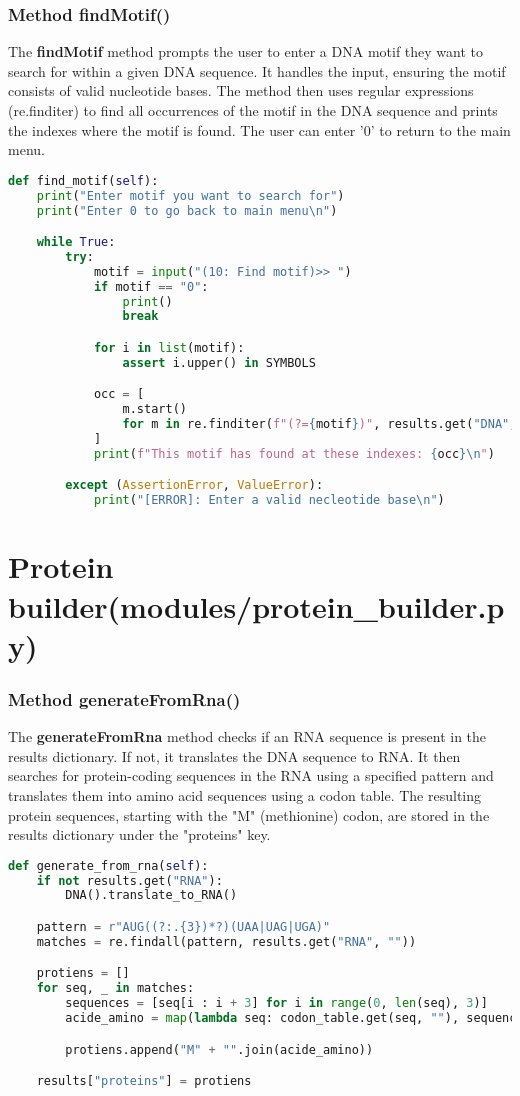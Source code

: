 \documentclass[11pt]{article}
\begin{document}
\subsubsection{Method findMotif()}
The \textbf{findMotif} method prompts the user to enter a DNA motif they want to search for within a given DNA sequence. It handles the input, ensuring the motif consists of valid nucleotide bases. The method then uses regular expressions (re.finditer) to find all occurrences of the motif in the DNA sequence and prints the indexes where the motif is found. The user can enter '0' to return to the main menu.
\begin{lstlisting}[language=Python, style=PythonStyle]
def find_motif(self):
    print("Enter motif you want to search for")
    print("Enter 0 to go back to main menu\n")

    while True:
        try:
            motif = input("(10: Find motif)>> ")
            if motif == "0":
                print()
                break

            for i in list(motif):
                assert i.upper() in SYMBOLS

            occ = [
                m.start()
                for m in re.finditer(f"(?={motif})", results.get("DNA", ""))
            ]
            print(f"This motif has found at these indexes: {occ}\n")

        except (AssertionError, ValueError):
            print("[ERROR]: Enter a valid necleotide base\n")
\end{lstlisting}

\section{Protein builder(modules/protein\_builder.py)}
\subsubsection{Method generateFromRna()}
The \textbf{generateFromRna} method checks if an RNA sequence is present in the results dictionary. If not, it translates the DNA sequence to RNA. It then searches for protein-coding sequences in the RNA using a specified pattern and translates them into amino acid sequences using a codon table. The resulting protein sequences, starting with the "M" (methionine) codon, are stored in the results dictionary under the "proteins" key.
\begin{lstlisting}[language=Python, style=PythonStyle]
def generate_from_rna(self):
    if not results.get("RNA"):
        DNA().translate_to_RNA()

    pattern = r"AUG((?:.{3})*?)(UAA|UAG|UGA)"
    matches = re.findall(pattern, results.get("RNA", ""))

    protiens = []
    for seq, _ in matches:
        sequences = [seq[i : i + 3] for i in range(0, len(seq), 3)]
        acide_amino = map(lambda seq: codon_table.get(seq, ""), sequences)

        protiens.append("M" + "".join(acide_amino))

    results["proteins"] = protiens
\end{lstlisting}
\end{document}
